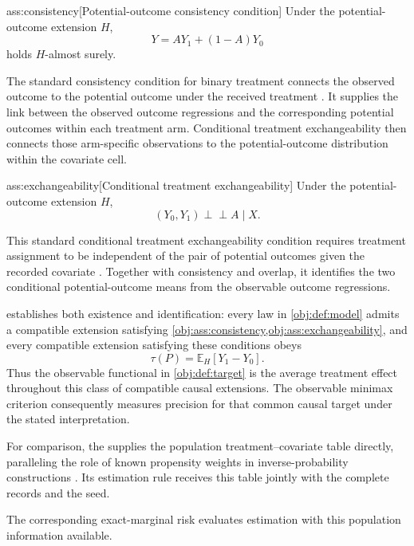 \documentclass[11pt]{article}
\begin{document}
\begin{assumptionv}{ass:consistency}[Potential-outcome consistency condition]
Under the potential-outcome extension \(H\),
\[
Y=AY_1+(1-A)Y_0
\]
holds \(H\)-almost surely.
\end{assumptionv}

The standard consistency condition for binary treatment connects the observed outcome to the potential outcome under the received treatment \citep{SplawaNeyman1990,Rubin1974}. It supplies the link between the observed outcome regressions and the corresponding potential outcomes within each treatment arm. Conditional treatment exchangeability then connects those arm-specific observations to the potential-outcome distribution within the covariate cell.

\begin{assumptionv}{ass:exchangeability}[Conditional treatment exchangeability]
Under the potential-outcome extension \(H\),
\[
(Y_0,Y_1)\perp\!\!\!\perp A\mid X.
\]
\end{assumptionv}

This standard conditional treatment exchangeability condition requires treatment assignment to be independent of the pair of potential outcomes given the recorded covariate \citep{Rosenbaum1983,Imbens2015}. Together with consistency and overlap, it identifies the two conditional potential-outcome means from the observable outcome regressions.

 establishes both existence and identification: every law in \cref{obj:def:model} admits a compatible extension satisfying \cref{obj:ass:consistency,obj:ass:exchangeability}, and every compatible extension satisfying these conditions obeys
\[
\tau(P)=\mathbb E_H[Y_1-Y_0].
\]
Thus the observable functional in \cref{obj:def:target} is the average treatment effect throughout this class of compatible causal extensions. The observable minimax criterion consequently measures precision for that common causal target under the stated interpretation.

For comparison, the  supplies the population treatment--covariate table directly, paralleling the role of known propensity weights in inverse-probability constructions \citep{Horvitz1952,Hirano2003}. Its estimation rule  receives this table jointly with the complete records and the seed.



The corresponding exact-marginal risk  evaluates estimation with this population information available.
\end{document}
